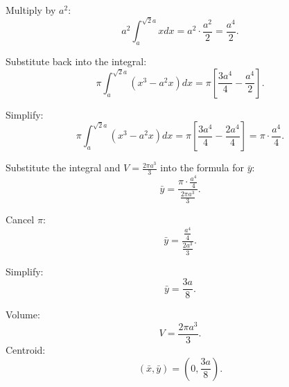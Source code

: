 \documentclass[12pt]{article}
\begin{document}
\begin{enumerate}
\begin{enumerate}
Multiply by $a^2$:
\[
a^2 \int_a^{\sqrt{2}a} x dx = a^2 \cdot \frac{a^2}{2} = \frac{a^4}{2}.
\]

Substitute back into the integral:
\[
\pi \int_a^{\sqrt{2}a} \left( x^3 - a^2x \right) dx = \pi \left[ \frac{3a^4}{4} - \frac{a^4}{2} \right].
\]

Simplify:
\[
\pi \int_a^{\sqrt{2}a} \left( x^3 - a^2x \right) dx = \pi \left[ \frac{3a^4}{4} - \frac{2a^4}{4} \right] = \pi \cdot \frac{a^4}{4}.
\]

Substitute the integral and $V = \frac{2 \pi a^3}{3}$ into the formula for $\bar{y}$:
\[
\bar{y} = \frac{\pi \cdot \frac{a^4}{4}}{\frac{2 \pi a^3}{3}}.
\]

Cancel $\pi$:
\[
\bar{y} = \frac{\frac{a^4}{4}}{\frac{2a^3}{3}}.
\]

Simplify:
\[
\bar{y} = \frac{3a}{8}.
\]

Volume:
\[
V = \frac{2 \pi a^3}{3}.
\]
Centroid:
\[
(\bar{x}, \bar{y}) = (0, \frac{3a}{8}).
\]

\end{enumerate}

\end{enumerate}
\end{document}
